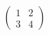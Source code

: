 \documentclass[preview]{standalone}
\begin{document}
\begin{align*}
\left(\begin{array}{cc} 1 & 2 \\ 3 & 4 \end{array}\right)
\end{align*}
\end{document}
